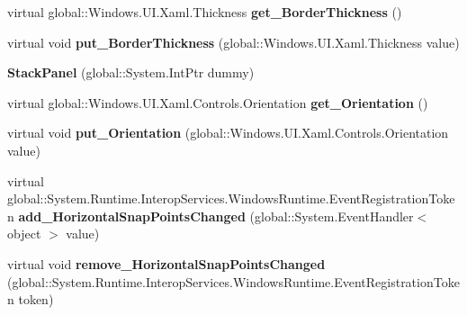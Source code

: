 \begin{DoxyCompactItemize}
\item 
\mbox{\label{class_windows_1_1_u_i_1_1_xaml_1_1_controls_1_1_stack_panel_a9293dc30db12d0f3fb0b1465b4f79c8f}} 
virtual global\+::\+Windows.\+U\+I.\+Xaml.\+Thickness {\bfseries get\+\_\+\+Border\+Thickness} ()
\item 
\mbox{\label{class_windows_1_1_u_i_1_1_xaml_1_1_controls_1_1_stack_panel_a38a527c8e47cfb60586c9887434f6e3f}} 
virtual void {\bfseries put\+\_\+\+Border\+Thickness} (global\+::\+Windows.\+U\+I.\+Xaml.\+Thickness value)
\item 
\mbox{\label{class_windows_1_1_u_i_1_1_xaml_1_1_controls_1_1_stack_panel_ae651e05203c4e2a0ddc04022e050a4e7}} 
{\bfseries Stack\+Panel} (global\+::\+System.\+Int\+Ptr dummy)
\item 
\mbox{\label{class_windows_1_1_u_i_1_1_xaml_1_1_controls_1_1_stack_panel_a9834a2d1432003975ba8a69f4aa789c7}} 
virtual global\+::\+Windows.\+U\+I.\+Xaml.\+Controls.\+Orientation {\bfseries get\+\_\+\+Orientation} ()
\item 
\mbox{\label{class_windows_1_1_u_i_1_1_xaml_1_1_controls_1_1_stack_panel_a99d2c21e5e153b28fba470789fc1748a}} 
virtual void {\bfseries put\+\_\+\+Orientation} (global\+::\+Windows.\+U\+I.\+Xaml.\+Controls.\+Orientation value)
\item 
\mbox{\label{class_windows_1_1_u_i_1_1_xaml_1_1_controls_1_1_stack_panel_a86815ce8db81cb7b06e7beebaa97e788}} 
virtual global\+::\+System.\+Runtime.\+Interop\+Services.\+Windows\+Runtime.\+Event\+Registration\+Token {\bfseries add\+\_\+\+Horizontal\+Snap\+Points\+Changed} (global\+::\+System.\+Event\+Handler$<$ object $>$ value)
\item 
\mbox{\label{class_windows_1_1_u_i_1_1_xaml_1_1_controls_1_1_stack_panel_aabdd867d8e829595aa1cd0066bb43b7c}} 
virtual void {\bfseries remove\+\_\+\+Horizontal\+Snap\+Points\+Changed} (global\+::\+System.\+Runtime.\+Interop\+Services.\+Windows\+Runtime.\+Event\+Registration\+Token token)

\end{DoxyCompactItemize}
